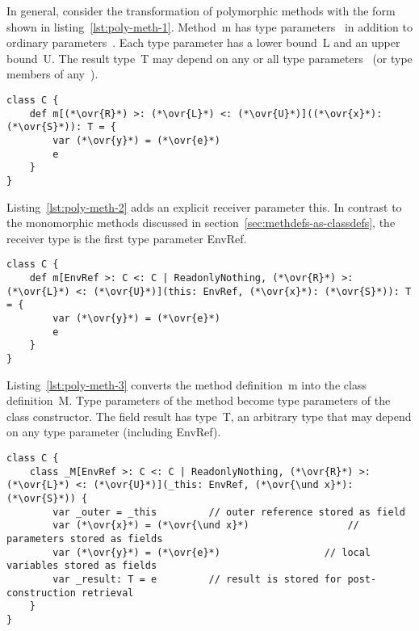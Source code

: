 In general, consider the transformation of polymorphic methods with the form shown in listing~\ref{lst:poly-meth-1}. Method~{\cd m} has type parameters~{\cd {}} in addition to ordinary parameters~{\cd {}}. Each type parameter has a lower bound~{\cd L} and an upper bound~{\cd U}. The result type~{\cd T} may depend on any or all type parameters~{\cd {}} (or type members of any~{\cd {}}).

\begin{lstlisting}[float=htbp, caption={Polymorphic Method Transformation 1}, label={lst:poly-meth-1}]
class C {
	def m[(*\ovr{R}*) >: (*\ovr{L}*) <: (*\ovr{U}*)]((*\ovr{x}*): (*\ovr{S}*)): T = {
		var (*\ovr{y}*) = (*\ovr{e}*)
		e
	}
}
\end{lstlisting}

Listing~\ref{lst:poly-meth-2} adds an explicit receiver parameter {\cd this}. In contrast to the monomorphic methods discussed in section~\ref{sec:methdefs-as-classdefs}, the receiver type is the first type parameter {\cd EnvRef}.

\begin{lstlisting}[float=htbp, caption={Polymorphic Method Transformation 2 (Explicit This)}, label={lst:poly-meth-2}]
class C {
	def m[EnvRef >: C <: C | ReadonlyNothing, (*\ovr{R}*) >: (*\ovr{L}*) <: (*\ovr{U}*)](this: EnvRef, (*\ovr{x}*): (*\ovr{S}*)): T = {
		var (*\ovr{y}*) = (*\ovr{e}*)
		e
	}
}
\end{lstlisting}

Listing~\ref{lst:poly-meth-3} converts the method definition~{\cd m} into the class definition~{\cd \und M}. Type parameters of the method become type parameters of the class constructor. The field {\cd \und result} has type~{\cd T}, an arbitrary type that may depend on any type parameter (including {\cd EnvRef}).

\begin{lstlisting}[float=htbp, caption={Polymorphic Method Transformation 3 (Closure)}, label={lst:poly-meth-3}]
class C {
	class _M[EnvRef >: C <: C | ReadonlyNothing, (*\ovr{R}*) >: (*\ovr{L}*) <: (*\ovr{U}*)](_this: EnvRef, (*\ovr{\und x}*): (*\ovr{S}*)) {
		var _outer = _this         // outer reference stored as field
		var (*\ovr{x}*) = (*\ovr{\und x}*)                 // parameters stored as fields
		var (*\ovr{y}*) = (*\ovr{e}*)                  // local variables stored as fields
		var _result: T = e         // result is stored for post-construction retrieval
	}
}
\end{lstlisting}




